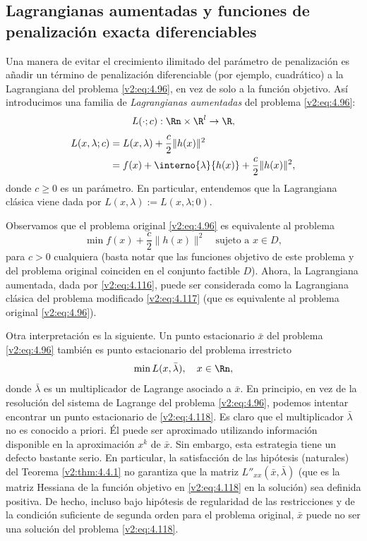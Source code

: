 \subsection{Lagrangianas aumentadas y funciones de penalización exacta diferenciables}\label{v2:sec:4.4.3}

Una manera de evitar el crecimiento ilimitado del parámetro de penalización es añadir un término de penalización diferenciable (por ejemplo, cuadrático) a la Lagrangiana del problema \eqref{v2:eq:4.96}, en vez de solo a la función objetivo. Así introducimos una familia de \textit{Lagrangianas aumentadas} del problema \eqref{v2:eq:4.96}:
\[
    L(\cdot; c) : \Rn \times \R^l \to \R,
\]
\begin{align}
    L(x, \lambda; c) &= L(x, \lambda) + \frac{c}{2}\|h(x)\|^2 \label{v2:eq:4.116} \\
    &= f(x) + \interno{\lambda}{h(x)} + \frac{c}{2}\|h(x)\|^2, \nonumber
\end{align}
donde $c \ge 0$ es un parámetro. En particular, entendemos que la Lagrangiana clásica viene dada por $L(x, \lambda) := L(x, \lambda; 0)$.

Observamos que el problema original \eqref{v2:eq:4.96} es equivalente al problema
\begin{equation}
    \min f(x) + \frac{c}{2}\|h(x)\|^2 \quad \text{sujeto a } x \in D,
    \label{v2:eq:4.117}
\end{equation}
para $c > 0$ cualquiera (basta notar que las funciones objetivo de este problema y del problema original coinciden en el conjunto factible $D$). Ahora, la Lagrangiana aumentada, dada por \eqref{v2:eq:4.116}, puede ser considerada como la Lagrangiana clásica del problema modificado \eqref{v2:eq:4.117} (que es equivalente al problema original \eqref{v2:eq:4.96}).

Otra interpretación es la siguiente. Un punto estacionario $\bar{x}$ del problema \eqref{v2:eq:4.96} también es punto estacionario del problema irrestricto
\begin{equation}
    \min L(x, \bar{\lambda}), \quad x \in \Rn,
    \label{v2:eq:4.118}
\end{equation}
donde $\bar{\lambda}$ es un multiplicador de Lagrange asociado a $\bar{x}$. En principio, en vez de la resolución del sistema de Lagrange del problema \eqref{v2:eq:4.96}, podemos intentar encontrar un punto estacionario de \eqref{v2:eq:4.118}. Es claro que el multiplicador $\bar{\lambda}$ no es conocido a priori. Él puede ser aproximado utilizando información disponible en la aproximación $x^k$ de $\bar{x}$. Sin embargo, esta estrategia tiene un defecto bastante serio. En particular, la satisfacción de las hipótesis (naturales) del Teorema \ref{v2:thm:4.4.1} no garantiza que la matriz $L''_{xx}(\bar{x}, \bar{\lambda})$ (que es la matriz Hessiana de la función objetivo en \eqref{v2:eq:4.118} en la solución) sea definida positiva. De hecho, incluso bajo hipótesis de regularidad de las restricciones y de la condición suficiente de segunda orden para el problema original, $\bar{x}$ puede no ser una solución del problema \eqref{v2:eq:4.118}.

